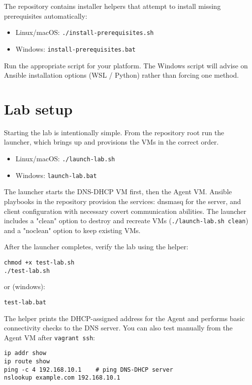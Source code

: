 \documentclass[11pt,a4paper]{article}
\begin{document}
The repository contains installer helpers that attempt to install missing
prerequisites automatically:

\begin{itemize}[noitemsep]
  \item Linux/macOS: \texttt{./install-prerequisites.sh}
  \item Windows: \texttt{install-prerequisites.bat}
\end{itemize}

Run the appropriate script for your platform. The Windows script will
advise on Ansible installation options (WSL / Python) rather than forcing
one method.

\section{Lab setup}
Starting the lab is intentionally simple. From the repository root run
the launcher, which brings up and provisions the VMs in the correct
order.

\begin{itemize}[noitemsep]
  \item Linux/macOS: \texttt{./launch-lab.sh}
  \item Windows: \texttt{launch-lab.bat}
\end{itemize}

The launcher starts the DNS-DHCP VM first, then the Agent VM. Ansible
playbooks in the repository provision the services: dnsmasq for the server,
and client configuration with necessary covert communication abilities. 
The launcher includes a "clean" option to destroy and
recreate VMs (\texttt{./launch-lab.sh clean}) and a "noclean" option to
keep existing VMs.

After the launcher completes, verify the lab using the helper:

\begin{verbatim}
chmod +x test-lab.sh
./test-lab.sh
\end{verbatim}

or (windows):

\begin{verbatim}
test-lab.bat
\end{verbatim}

The helper prints the DHCP-assigned address for the Agent and performs
basic connectivity checks to the DNS server. You can also test manually
from the Agent VM after \texttt{vagrant ssh}:

\begin{verbatim}
ip addr show
ip route show
ping -c 4 192.168.10.1    # ping DNS-DHCP server
nslookup example.com 192.168.10.1
\end{verbatim}
\end{document}
